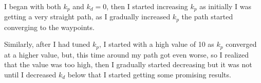 \documentclass[answers]{exam}
\begin{document}
\begin{questions}
\begin{figure}[H]
        \qquad
        \qquad
        \label{fig:Comparison}\\
    \end{figure}

    I began with both $k_p$ and $k_d = 0$, then I started increasing $k_p$ as
    initially I was getting a very straight path, as I gradually increased $k_p$
    the path started converging to the waypoints.

    Similarly, after I had tuned $k_p$, I started with a high value of 10 as $k_p$
    converged at a higher value, but, this time around my path got even worse, so I
    realized that the value was too high, then I gradually started decreasing but
    it was not until I decreased $k_d$ below that I started getting some promising
    results.


\end{questions}
\end{document}

